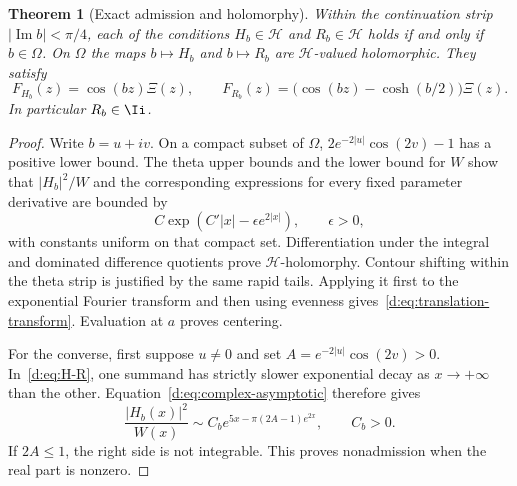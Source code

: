 \documentclass[11pt,a4paper]{article}
\numberwithin{equation}{section}
\newtheorem{theorem}{Theorem}[section]
\theoremstyle{definition}\newtheorem{definition}[theorem]{Definition}
\theoremstyle{remark}\newtheorem{remark}[theorem]{Remark}
\newcommand{\Hh}{\mathcal H}\newcommand{\Hw}{\mathcal H}
\begin{document}
\begin{theorem}[Exact admission and holomorphy]\label{d:thm:lens}
Within the continuation strip $|\operatorname{Im}b|<\pi/4$, each of the conditions $H_b\in\Hh$ and $R_b\in\Hh$ holds if and only if $b\in\Omega$. On $\Omega$ the maps $b\mapsto H_b$ and $b\mapsto R_b$ are $\Hh$-valued holomorphic. They satisfy
\begin{equation}\label{d:eq:translation-transform}
 F_{H_b}(z)=\cos(bz)\Xi(z),\qquad
 F_{R_b}(z)=\bigl(\cos(bz)-\cosh(b/2)\bigr)\Xi(z).
\end{equation}
In particular $R_b\in\Ii$.
\end{theorem}
\begin{proof}
Write $b=u+iv$. On a compact subset of $\Omega$,
$2e^{-2|u|}\cos(2v)-1$ has a positive lower bound. The theta upper bounds and the lower bound for $W$ show that $|H_b|^2/W$ and the corresponding expressions for every fixed parameter derivative are bounded by
\begin{equation}\label{d:eq:lens-majorant}
 C\exp(C'|x|-\epsilon e^{2|x|}),\qquad \epsilon>0,
\end{equation}
with constants uniform on that compact set. Differentiation under the integral and dominated difference quotients prove $\Hh$-holomorphy. Contour shifting within the theta strip is justified by the same rapid tails. Applying it first to the exponential Fourier transform and then using evenness gives~\eqref{d:eq:translation-transform}. Evaluation at $a$ proves centering.

For the converse, first suppose $u\ne0$ and set $A=e^{-2|u|}\cos(2v)>0$. In~\eqref{d:eq:H-R}, one summand has strictly slower exponential decay as $x\to+\infty$ than the other. Equation~\eqref{d:eq:complex-asymptotic} therefore gives
\begin{equation}\label{d:eq:nonadmission-u}
 \frac{|H_b(x)|^2}{W(x)}
 \sim C_b e^{5x-\pi(2A-1)e^{2x}},\qquad C_b>0.
\end{equation}
If $2A\le1$, the right side is not integrable. This proves nonadmission when the real part is nonzero.


\end{proof}
\end{document}
